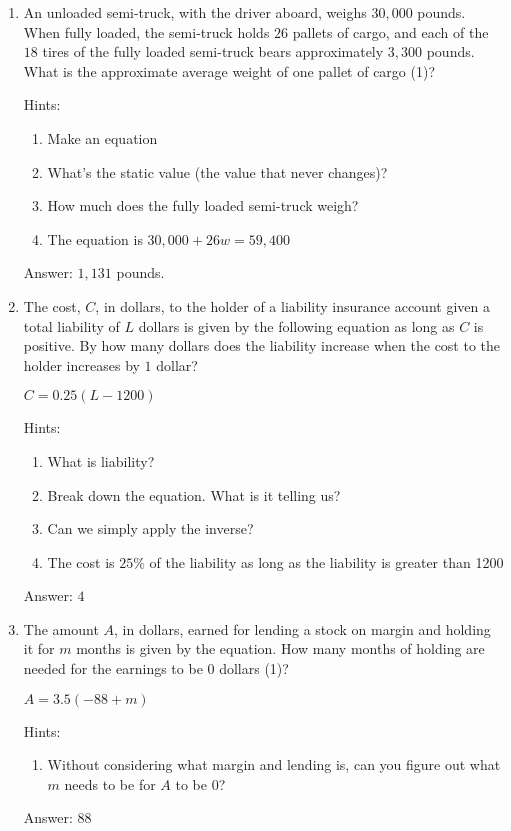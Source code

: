 \documentclass{article}
\begin{document}
\begin{enumerate}
{	      \(C=0.85(130)h+15T\)

	      Answer: $15T$ is the total cost of renting water toys.}

	\item {
	      An unloaded semi-truck, with the driver aboard, weighs $30,000$ pounds. When fully loaded, the semi-truck holds $26$ pallets of cargo, and each of the $18$ tires of the fully loaded semi-truck bears approximately $3,300$ pounds. What is the approximate average weight of one pallet of cargo (1)?

	      Hints:
	      \begin{enumerate}
		      \item{Make an equation}
		      \item{What's the static value (the value that never changes)?}
		      \item{How much does the fully loaded semi-truck weigh?}
		      \item{The equation is \(30,000 + 26w = 59,400\)}
	      \end{enumerate}

	      Answer: $1,131$ pounds.
	      }

	\item{The cost, $C$, in dollars, to the holder of a liability insurance account given a total liability of $L$ dollars is given by the following equation as long as $C$ is positive. By how many dollars does the liability increase when the cost to the holder increases by $1$ dollar?

	      \(C=0.25(L-1200)\)

	      Hints:
	      \begin{enumerate}
		      \item{What is liability?}
		      \item{Break down the equation. What is it telling us?}
		      \item{Can we simply apply the inverse?}
		      \item{The cost is $25\%$ of the liability as long as the liability is greater than 1200}
	      \end{enumerate}

	      Answer: $4$}

	\item{The amount $A$, in dollars, earned for lending a stock on margin and holding it for $m$ months is given by the equation. How many months of holding are needed for the earnings to be $0$ dollars (1)?

	      \(A=3.5(-88+m)\)

	      Hints:
	      \begin{enumerate}
		      \item{Without considering what margin and lending is, can you figure out what $m$ needs to be for $A$ to be $0$?}
	      \end{enumerate}

	      Answer: $88$
	      }


\end{enumerate}
\end{document}
